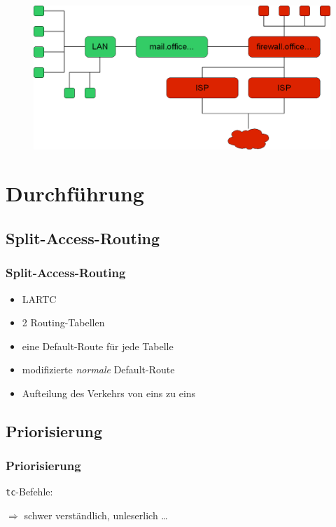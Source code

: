 \documentclass[14pt]{beamer}
\begin{document}
\begin{frame}
\begin{figure}[h!]
      \includegraphics[width=1\textwidth]{GFX/netzplan_soll}
  \end{figure}
\end{frame}



\section{Durchführung}
\subsection{Split-Access-Routing}
\begin{frame}
\frametitle<presentation>{Split-Access-Routing}
 \begin{itemize}
    \item LARTC
    \item 2 Routing-Tabellen
    \item eine Default-Route für jede Tabelle
    \item modifizierte \emph{normale} Default-Route
    \item Aufteilung des Verkehrs von eins zu eins
  \end{itemize}
\end{frame}


\subsection{Priorisierung}
\begin{frame}%
\frametitle<presentation>{Priorisierung}
\texttt{tc}-Befehle:

\begin{tiny}
\end{tiny}
\lstset{basicstyle=\tiny, showstringspaces=false, tabsize=2,breaklines=true}
  

$\Rightarrow$ schwer verständlich, unleserlich \dots
\end{frame}
\end{document}
